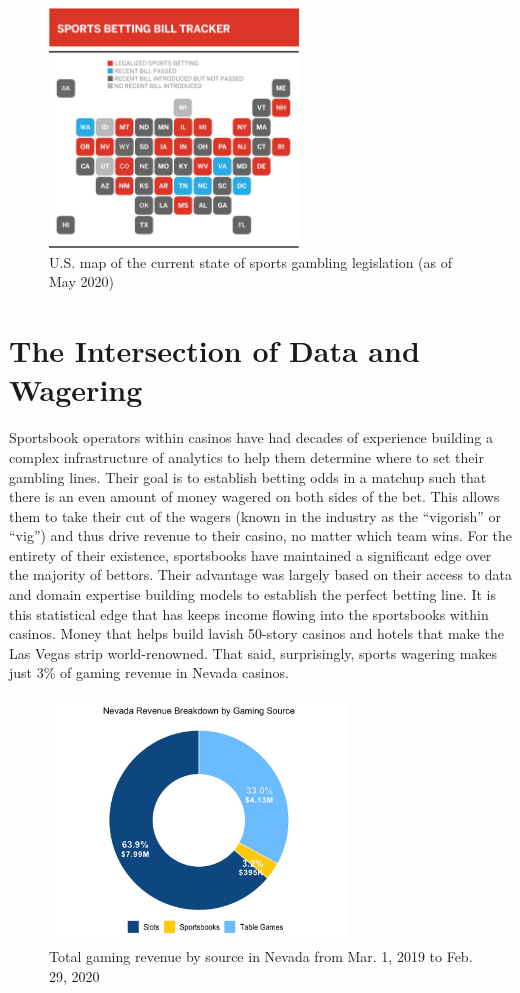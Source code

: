 \documentclass [MS] {uclathes}
\begin{document}
\begin{figure}[h]
\centering
  \includegraphics[width=250px]{20200520_betting_map.png}
  \caption{U.S. map of the current state of sports gambling legislation (as of May 2020)}
\end{figure}

\section{The Intersection of Data and Wagering}
Sportsbook operators within casinos have had decades of experience building a complex infrastructure of analytics to help them determine where to set their gambling lines. Their goal is to establish betting odds in a matchup such that there is an even amount of money wagered on both sides of the bet. This allows them to take their cut of the wagers (known in the industry as the ``vigorish'' or ``vig'') and thus drive revenue to their casino, no matter which team wins. For the entirety of their existence, sportsbooks have maintained a significant edge over the majority of bettors. Their advantage was largely based on their access to data and domain expertise building models to establish the perfect betting line. It is this statistical edge that has keeps income flowing into the sportsbooks within casinos. Money that helps build lavish 50-story casinos and hotels that make the Las Vegas strip world-renowned. That said, surprisingly, sports wagering makes just 3\% of gaming revenue in Nevada casinos. \cite{nevgame} 

\begin{figure}[h]
\centering
  \includegraphics[width=300px]{gaming_revenue.png}
  \caption{Total gaming revenue by source in Nevada from Mar. 1, 2019 to Feb. 29, 2020}
\end{figure}
\end{document}
